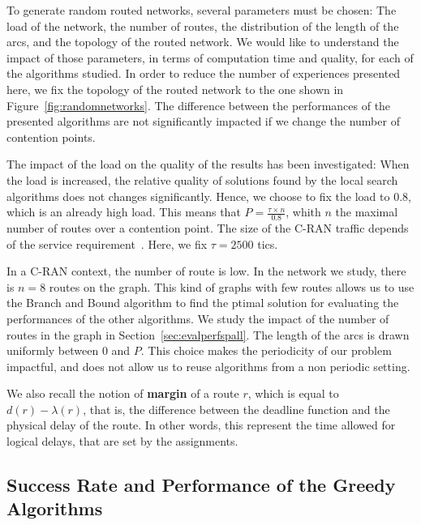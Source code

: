 To generate random routed networks, several parameters must be chosen: The load of the network, the number of routes, the distribution of the length of the arcs, and the topology of the routed network. We would like to understand the impact of those parameters, in terms of computation time and quality, for each of the algorithms studied. In order to reduce the number of experiences presented here, we fix the topology of the routed network to the one shown in Figure~\ref{fig:randomnetworks}. The difference between the performances of the presented algorithms are not significantly impacted if we change the number of contention points. 

 
 The impact of the load on the quality of the results has been investigated: When the load is increased, the relative quality of solutions found by the local search algorithms does not changes significantly. Hence, we choose to fix the load to $0.8$, which is an already high load. This means that $P = \frac{\tau \times n}{0.8}$, whith $n$ the maximal number of routes over a contention point. The size of the C-RAN traffic depends of the service requirement~\cite{mobile2011c}. Here, we fix $\tau = 2500$ tics.
  
In a C-RAN context, the number of route is low. In the network we study, there is $n=8$ routes on the graph. This kind of graphs with few routes allows us to use the Branch and Bound algorithm to find the ptimal solution for evaluating the performances of the other algorithms. We study the impact of the number of routes in the graph in Section~\ref{sec:evalperfspall}. The length of the arcs is drawn uniformly between $0$ and $P$. This choice makes the periodicity of our problem impactful, and does not allow  us to reuse algorithms from a non periodic setting.

We also recall the notion of \textbf{margin} of a route $r$, which is equal to $d(r) - \lambda(r)$, that is, the difference between the deadline function and the physical delay of the route. In other words, this represent the time allowed for logical delays, that are set by the assignments.



\subsection{Success Rate and Performance of the Greedy Algorithms}


